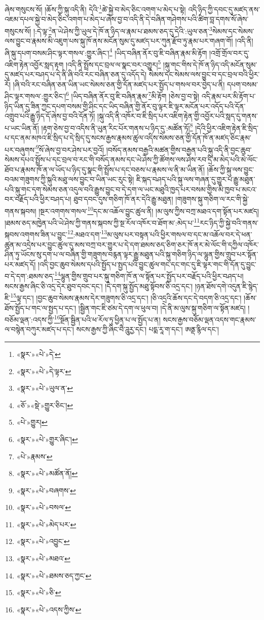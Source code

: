 ཞེས་གསུངས་སོ། །ཆོས་ཀྱི་སྐུ་འདི་ནི། དེའི་\footnote{«སྣར་»«པེ་»དེ་}ཚེ་སྐྱེ་བ་མེད་ཅིང་འགག་པ་མེད་པ་སྟེ། འདི་ཉིད་ཀྱི་དབང་དུ་མཛད་ནས་འཇམ་དཔལ་སྐྱེ་བ་མེད་ཅིང་འགག་པ་མེད་པ་ཞེས་བྱ་བ་འདི་ནི་དེ་བཞིན་གཤེགས་པའི་ཚིག་བླ་དགས་སོ་ཞེས་གསུངས་སོ། །:དེ་ལྟ་\footnote{«སྣར་»«པེ་»དེ་ལྟར་}ན་ཡེ་ཤེས་ཀྱི་ཡུལ་དེ་ཁོ་ན་ཉིད་ལ་རྣམ་པ་ཐམས་ཅད་དུ་དེའི་:ཡུལ་ཅན་\footnote{«སྣར་»«པེ་»ཡུལ་ན་}སེམས་དང་སེམས་ལས་བྱུང་བ་རྣམས་མི་འཇུག་པས་སྐུ་ཁོ་ནས་མངོན་སུམ་དུ་མཛད་པར་ཀུན་རྫོབ་ཏུ་རྣམ་པར་གཞག་གོ། །འདི་ནི། ཞི་སྐུ་དཔག་བསམ་ཤིང་ལྟར་གསལ་:གྱུར་ཞིང་།\footnote{«ཅོ་»«སྡེ་»གྱུར་ཅིང་།} །ཡིད་བཞིན་ནོར་བུ་ཇི་བཞིན་རྣམ་མི་རྟོག །འགྲོ་གྲོལ་བར་དུ་འཇིག་རྟེན་འབྱོར་སླད་རྟག །འདི་ནི་སྤྲོས་དང་བྲལ་ལ་སྣང་བར་འགྱུར།\footnote{«པེ་»གྱུར།} །སྐུ་གང་གིས་དེ་ཁོ་ན་ཉིད་འདི་མངོན་སུམ་དུ་མཛད་པར་བཤད་པ་དེ་ནི་ཞི་བའི་རང་བཞིན་ཅན་དུ་འདོད་དེ། སེམས་དང་སེམས་ལས་བྱུང་བ་དང་བྲལ་བའི་ཕྱིར་རོ། །ཞི་བའི་རང་བཞིན་ཅན་ཡིན་ཡང་སེམས་ཅན་གྱི་དོན་མཛད་པར་སྤྱོད་པ་གསལ་བར་བྱེད་པ་ནི། དཔག་བསམ་ཤིང་ལྟར་གསལ་:གྱུར་ཅིང་།\footnote{«སྣར་»«པེ་»གྱུར་ཞིང་།} །ཡིད་བཞིན་ནོར་བུ་ཇི་བཞིན་རྣམ་\footnote{«པེ་»རྣམས་}མི་རྟོག །ཅེས་བྱ་བ་སྟེ། འདི་རྣམ་པར་མི་རྟོག་པ་ཉིད་ཡིན་དུ་ཟིན་ཀྱང་དཔག་བསམ་གྱི་ཤིང་དང་ཡིད་བཞིན་གྱི་ནོར་བུ་ལྟར་ཇི་ལྟར་མངོན་པར་འདོད་པའི་དོན་འགྲུབ་པའི་རྒྱུ་ཉིད་དོ་ཞེས་བྱ་བའི་དོན་ཏོ། །སྐུ་འདི་ནི་འཁོར་བ་ཇི་སྲིད་པར་འཇིག་རྟེན་གྱི་འབྱོར་པའི་སླད་དུ་གནས་པ་ཡང་ཡིན་ནོ། །རྟག་ཅེས་བྱ་བ་འདིས་ནི་ཡུན་རིང་པོར་གནས་པ་ཉིད་དུ་:མཚོན་ཏོ།\footnote{«སྣར་»«པེ་»མཚོན་ནོ།} །དེའི་ཕྱིར་འཇིག་རྟེན་ཇི་སྲིད་པ་དང་ནམ་མཁའ་ཇི་སྲིད་པ་དེ་སྲིད་དུ་སངས་རྒྱས་རྣམས་ཚུལ་འདིས་སེམས་ཅན་གྱི་དོན་ཁོ་ན་མཛད་ཅིང་རྣམ་པར་བཞུགས་\footnote{«སྣར་»«པེ་»བཞགས་}སོ་ཞེས་བྱ་བར་ཤེས་པར་བྱའོ། །བསོད་ནམས་བརྒྱའི་མཚན་གྱིས་བརྒྱན་པའི་སྐུ་འདི་ནི་བྱང་ཆུབ་སེམས་དཔའ་སྤྲོས་པ་དང་བྲལ་བ་རང་གི་བསོད་ནམས་དང་ཡེ་ཤེས་ཀྱི་ཚོགས་ལས་ཤེས་རབ་དྲི་མ་མེད་པའི་མེ་ལོང་ཐོབ་པ་རྣམས་ཁོ་ན་ལ་ཡོད་པ་ཉིད་དུ་སྣང་གི་སྤྲོས་པ་དང་བཅས་པ་རྣམས་ལ་ནི་མ་ཡིན་ནོ། །ཆོས་ཀྱི་སྐུ་ལས་བྱུང་བའམ་གཟུགས་ཀྱི་སྐུའི་མཐུ་ལས་བྱུང་བ་ཡིན་ཡང་རུང་སྟེ། ཇི་སྐད་བཤད་པའི་སྐུ་ལས་གཞན་དུ་གྱུར་པ་རྒྱུ་མཐུན་པའི་སྐུ་གང་དག་སེམས་ཅན་འདུལ་བའི་རྒྱུས་བྱུང་བ་དེ་དག་ལ་ཡང་མཐུའི་ཁྱད་པར་བསམ་གྱིས་མི་ཁྱབ་པ་མངའ་བར་བརྗོད་པའི་ཕྱིར་བཤད་པ། ཐུབ་དབང་དུས་གཅིག་ཁོ་ནར་དེའི་རྒྱུ་མཐུན། །གཟུགས་སྐུ་གཅིག་ལ་རང་གི་སྐྱེ་གནས་སྐབས། །སྔར་འགགས་གསལ་\footnote{«སྣར་»«པེ་»བསལ་}དང་མ་འཆོལ་བྱུང་ཚུལ་ནི། །མ་ལུས་ཀྱིས་བཀྲ་མཐའ་དག་སྟོན་པར་མཛད། །ཐམས་ཅད་མཁྱེན་པའི་ཡེ་ཤེས་ཀྱི་གནས་སྐབས་ཀྱི་སྔ་རོལ་འཁོར་བ་ཐོག་མ་:མེད་པ་\footnote{«སྣར་»«པེ་»མེད་པར་}རང་ཉིད་ཀྱི་སྐྱེ་བའི་གནས་སྐབས་འགགས་ཟིན་པ་བྱུང་\footnote{«སྣར་»«པེ་»འབྱུང་}:མཐའ་དག་\footnote{«སྣར་»«པེ་»མཐའ་}མ་ལུས་པར་བསྟན་པའི་ཕྱིར་གསལ་བ་དང་མ་འཆོལ་བར་དེ་ཕན་ཚུན་མ་འདྲེས་པར་བྱུང་ཚུལ་དུ་མས་བཀྲ་བར་གྱུར་པ་དེ་དག་ཐམས་ཅད་ཅིག་ཅར་ཁོ་ནར་མེ་ལོང་གི་དཀྱིལ་འཁོར་ཤིན་ཏུ་ཡོངས་སུ་དག་པ་ལ་བཞིན་གྱི་གཟུགས་བརྙན་ལྟར་རྒྱུ་མཐུན་པའི་སྐུ་གཅིག་ཉིད་ལ་ལྷུན་གྱིས་གྲུབ་པར་སྟོན་པར་མཛད་དོ། །འདི་བྱང་ཆུབ་སེམས་དཔའི་སྤྱོད་པ་སྤྱད་པའི་བྱུང་ཚུལ་གང་དང་གང་དུ་ཇི་ལྟར་གང་གི་དོན་དུ་བྱུང་བ་དེ་དག་:ཐམས་ཅད་\footnote{«སྣར་»«པེ་»ཐམས་ཅད་ཀྱང་}ལྷུན་གྱིས་གྲུབ་པར་སྐུ་གཅིག་ཁོ་ན་ལ་སྟོན་པར་སྤྱོད་པར་བརྗོད་པའི་ཕྱིར་བཤད་པ། སངས་རྒྱས་ཞིང་ཅི་འདྲ་དེར་ཐུབ་དབང་དང་། །དེ་དག་སྐུ་སྤྱོད་མཐུ་སྟོབས་ཅི་འདྲ་དང་། །ཉན་ཐོས་དགེ་འདུན་ཇི་སྙེད་ཇི་\footnote{«སྣར་»«པེ་»ཅི་}ལྟ་དང་། །བྱང་ཆུབ་སེམས་རྣམས་དེར་གཟུགས་ཅི་འདྲ་དང་། །ཅི་འདྲའི་ཆོས་དང་དེ་བདག་ཅི་འདྲ་དང་། །ཆོས་ཐོས་སྤྱོད་པ་གང་ལ་སྤྱད་པ་དང་། །སྦྱིན་གང་ཇི་ཙམ་དེ་དག་ལ་ཕུལ་བ། །དེ་ནི་མ་ལུས་སྐུ་གཅིག་ལ་སྟོན་མཛད། །བཅོམ་ལྡན་:འདས་ཀྱི་\footnote{«སྣར་»«པེ་»འདས་ཀྱིས་}སྔོན་སྦྱིན་པའི་ཕ་རོལ་ཏུ་ཕྱིན་པ་ལ་སྤྱོད་པ་ན། སངས་རྒྱས་བཅོམ་ལྡན་འདས་གང་རྣམས་ལ་བསྙེན་བཀུར་མཛད་པ་དང་། སངས་རྒྱས་ཀྱི་ཞིང་བཻ་ཌཱུརྱ་དང་། པདྨ་རཱ་ག་དང་། ཨནྡ་རྙིལ་དང་། 